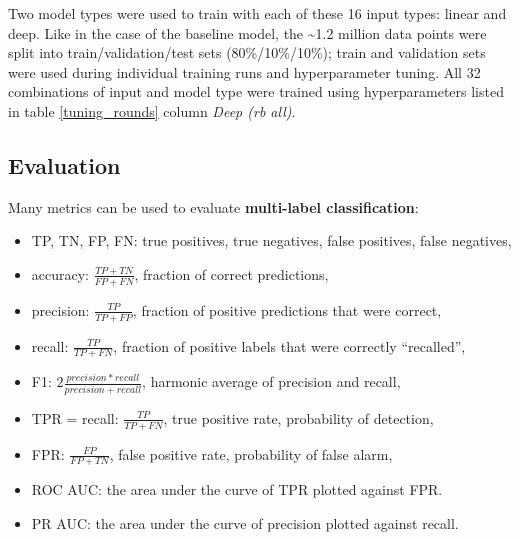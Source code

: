 Two model types were used to train with each of these 16 input types: linear and deep.
Like in the case of the baseline model, the \textasciitilde1.2 million data points were split into train/validation/test sets (80\%/10\%/10\%); train and validation sets were used during individual training runs and hyperparameter tuning.
All 32 combinations of input and model type were trained using hyperparameters listed in table \ref{tuning_rounds} column \textit{Deep (rb all)}.


\subsection{Evaluation}

Many metrics can be used to evaluate \textbf{multi-label classification}:

\begin{itemize}
  \item TP, TN, FP, FN: true positives, true negatives, false positives, false negatives,
  \item accuracy: $\frac{TP + TN}{FP + FN}$, fraction of correct predictions,
  \item precision: $\frac{TP}{TP + FP}$, fraction of positive predictions that were correct,
  \item recall: $\frac{TP}{TP + FN}$, fraction of positive labels that were correctly ``recalled'',
  \item F1: $2\frac{precision * recall}{precision + recall}$, harmonic average of precision and recall,
  \item TPR = recall: $\frac{TP}{TP+FN}$, true positive rate, probability of detection,
  \item FPR: $\frac{FP}{FP+TN}$, false positive rate, probability of false alarm,
  \item ROC AUC: the area under the curve of TPR plotted against FPR.
  \item PR AUC: the area under the curve of precision plotted against recall.
\end{itemize}

